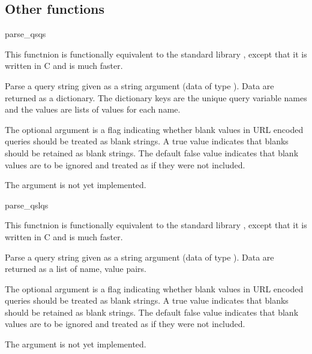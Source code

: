 \subsection{Other functions\label{pyapi-util-funcs}}

\begin{funcdesc}{parse_qs}{qs}

This functnion is functionally equivalent to the standard library
 , except that it is written in C and is
much faster. 

Parse a query string given as a string argument (data of type
).  Data are
returned as a dictionary.  The dictionary keys are the unique query
variable names and the values are lists of values for each name.

The optional argument  is a flag indicating
whether blank values in URL encoded queries should be treated as blank
strings.  A true value indicates that blanks should be retained as
blank strings.  The default false value indicates that blank values
are to be ignored and treated as if they were not included.

 The  argument is not yet implemented.

\end{funcdesc}


\begin{funcdesc}{parse_qsl}{qs}

This functnion is functionally equivalent to the standard library
 , except that it is written in C and is
much faster. 

Parse a query string given as a string argument (data of type
).  Data are
returned as a list of name, value pairs.

The optional argument  is a flag indicating
whether blank values in URL encoded queries should be treated as blank
strings.  A true value indicates that blanks should be retained as
blank strings.  The default false value indicates that blank values
are to be ignored and treated as if they were not included.

 The  argument is not yet implemented.

\end{funcdesc}


